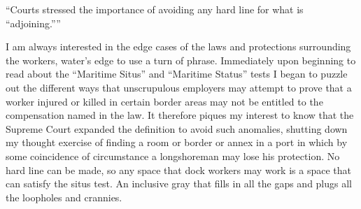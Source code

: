 
\date{Admiralty Law -- 30 January 2024}


\begin{flushleft}
\thetitle

\thedate

\theauthor
\end{flushleft}

``Courts stressed the importance of avoiding any hard line for what is “adjoining.”''  %

I am always interested in the edge cases of the laws and protections surrounding the workers, water’s edge to use a turn of phrase. Immediately upon beginning to read about the “Maritime Situs” and “Maritime Status” tests I began to puzzle out the different ways that unscrupulous employers may attempt to prove that a worker injured or killed in certain border areas may not be entitled to the compensation named in the law. It therefore piques my interest to know that the Supreme Court expanded the definition to avoid such anomalies, shutting down my thought exercise of finding a room or border or annex in a port in which by some coincidence of circumstance a longshoreman may lose his protection. No hard line can be made, so any space that dock workers may work is a space that can satisfy the situs test. An inclusive gray that fills in all the gaps and plugs all the loopholes and crannies.

